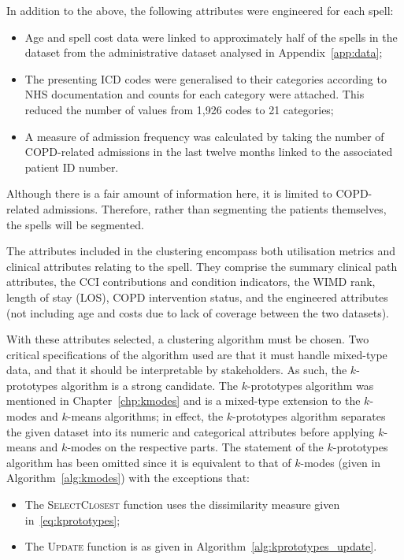 In addition to the above, the following attributes were engineered for each
spell:

\begin{itemize}
    \item Age and spell cost data were linked to approximately half of the
        spells in the dataset from the administrative dataset analysed in
        Appendix~\ref{app:data};
    \item The presenting ICD codes were generalised to their categories
        according to NHS documentation and counts for each category were
        attached. This reduced the number of values from
        1,926 codes to 21 categories;
    \item A measure of admission frequency was calculated by taking the number
        of COPD-related admissions in the last twelve months linked to the
        associated patient ID number.
\end{itemize}

Although there is a fair amount of information here, it is limited to
COPD-related admissions. Therefore, rather than segmenting the patients
themselves, the spells will be segmented. 

The attributes included in the clustering encompass both utilisation metrics and
clinical attributes relating to the spell. They comprise the summary clinical
path attributes, the CCI contributions and condition indicators, the WIMD rank,
length of stay (LOS), COPD intervention status, and the engineered attributes
(not including age and costs due to lack of coverage between the two datasets).

With these attributes selected, a clustering algorithm must be chosen. Two
critical specifications of the algorithm used are that it must handle mixed-type
data, and that it should be interpretable by stakeholders. As such, the
\(k\)-prototypes algorithm is a strong candidate. The \(k\)-prototypes algorithm
was mentioned in Chapter~\ref{chp:kmodes} and is a mixed-type extension to the
\(k\)-modes and \(k\)-means algorithms; in effect, the \(k\)-prototypes
algorithm separates the given dataset into its numeric and categorical
attributes before applying \(k\)-means and \(k\)-modes on the respective parts.
The statement of the \(k\)-prototypes algorithm has been omitted since it is
equivalent to that of \(k\)-modes (given in Algorithm~\ref{alg:kmodes}) with the
exceptions that:

\begin{itemize}
    \item The \textsc{SelectClosest} function uses the dissimilarity measure
        given in~\eqref{eq:kprototypes};
    \item The \textsc{Update} function is as given in
        Algorithm~\ref{alg:kprototypes_update}.
\end{itemize}

